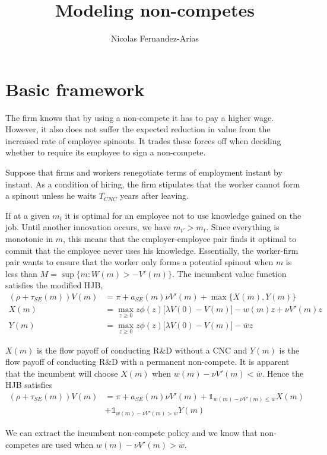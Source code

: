 \documentclass[12pt,english]{article}
\theoremstyle{remark}
\begin{document}
	
\title{Modeling non-competes}
\author{Nicolas Fernandez-Arias}
\maketitle


\section{Basic framework}

The firm knows that by using a non-compete it has to pay a higher wage. However, it also does not suffer the expected reduction in value from the increased rate of employee spinouts. It trades these forces off when deciding whether to require its employee to sign a non-compete.

Suppose that firms and workers renegotiate terms of employment instant by instant. As a condition of hiring, the firm stipulates that the worker cannot form a spinout unless he waits $T_{CNC}$ years after leaving. 

If at a given $m_t$ it is optimal for an employee not to use knowledge gained on the job. Until another innovation occurs, we have $m_{t'} > m_t$. Since everything is monotonic in $m$, this means that the employer-employee pair finds it optimal to commit that the employee never uses his knowledge. Essentially, the worker-firm pair wants to ensure that the worker only forms a potential spinout when $m$ is less than $M = \sup \{ m : W(m) > -V'(m) \}$. The incumbent value function satisfies the modified HJB, 
\begin{align}
	(\rho + \tau_{SE}(m)) V(m) &= \pi + a_{SE}(m) \nu V'(m) + \max \Big\{ X(m) , Y(m)   \Big\} \\
	X(m) &= \max_{z \ge 0} z\phi(z) \big[ \lambda V(0) - V(m) \big] - w(m)z + \nu V'(m) z \\
	Y(m) &= \max_{z \ge 0} z\phi(z) \big[ \lambda V(0) - V(m) \big] - \overline{w} z
\end{align}

$X(m)$ is the flow payoff of conducting R\&D without a CNC and $Y(m)$ is the flow payoff of conducting R\&D with a permanent non-compete. It is apparent that the incumbent will choose $X(m)$ when $w(m) - \nu V'(m) < \overline{w}$. Hence the HJB satisfies
\begin{align}
	(\rho + \tau_{SE}(m)) V(m) &= \pi + a_{SE}(m) \nu V'(m) + \mathbb{1}_{w(m) - \nu V'(m) \le \overline{w}} X(m) \nonumber \\
	&+ \mathbb{1}_{w(m) - \nu V'(m) > \overline{w}} Y(m)   
\end{align} 

We can extract the incumbent non-compete policy and we know that non-competes are used when $w(m) - \nu V'(m) > \overline{w}$.
\end{document}
